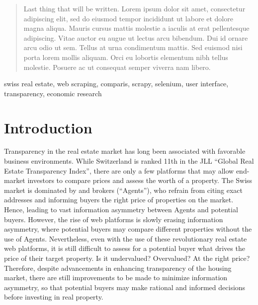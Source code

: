 \documentclass[main]{subfiles}
\begin{document}
\begin{abstract}
Last thing that will be written. Lorem ipsum dolor sit amet, consectetur adipiscing elit, sed do eiusmod tempor incididunt ut labore et dolore magna aliqua. Mauris cursus mattis molestie a iaculis at erat pellentesque adipiscing. Vitae auctor eu augue ut lectus arcu bibendum. Dui id ornare arcu odio ut sem. Tellus at urna condimentum mattis. Sed euismod nisi porta lorem mollis aliquam. Orci eu lobortis elementum nibh tellus molestie. Posuere ac ut consequat semper viverra nam libero. 
\end{abstract}
    
\begin{IEEEkeywords}
swiss real estate, web scraping, comparis, scrapy, selenium, user interface, transparency, economic research
\end{IEEEkeywords}
    
\section{Introduction}
Transparency in the real estate market has long been associated with favorable business environments. 
While Switzerland is ranked 11th in the JLL “Global Real Estate Transparency Index”, 
there are only a few platforms that may allow end-market investors to compare prices and assess the worth of a property.
The Swiss market is dominated by  and brokers (“Agents”),
who refrain from citing exact addresses and informing buyers the right price of properties on the market. 
Hence, leading to vast information asymmetry between Agents and potential buyers.
However, the rise of web platforms is slowly erasing information asymmetry, 
where potential buyers may compare different properties without the use of Agents. 
Nevertheless, even with the use of these revolutionary real estate web platforms, 
it is still difficult to assess for a potential buyer what drives the price of their target property. 
Is it undervalued? Overvalued? At the right price?
Therefore, despite advancements in enhancing transparency of the housing market, 
there are still improvements to be made to minimize information asymmetry, 
so that potential buyers may make rational and informed decisions before investing in real property.
\end{document}
